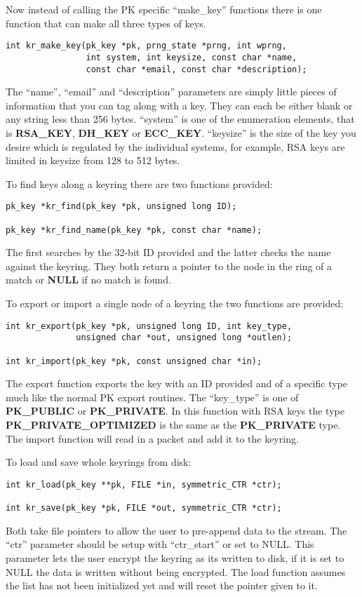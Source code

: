 \documentclass{book}
\begin{document}
Now instead of calling the PK specific ``make\_key'' functions there is one function that can make all three types of keys.
\begin{verbatim}
int kr_make_key(pk_key *pk, prng_state *prng, int wprng, 
                int system, int keysize, const char *name,
                const char *email, const char *description);
\end{verbatim}
The ``name'', ``email'' and ``description'' parameters are simply little pieces of information that you can tag along with a
key.  They can each be either blank or any string less than 256 bytes.  ``system'' is one of the enumeration elements, that
is {\bf RSA\_KEY}, {\bf DH\_KEY} or {\bf ECC\_KEY}.  ``keysize'' is the size of the key you desire which is regulated by
the individual systems, for example, RSA keys are limited in keysize from 128 to 512 bytes.

To find keys along a keyring there are two functions provided:
\begin{verbatim}
pk_key *kr_find(pk_key *pk, unsigned long ID);

pk_key *kr_find_name(pk_key *pk, const char *name);
\end{verbatim}
The first searches by the 32-bit ID provided and the latter checks the name against the keyring.  They both return a pointer
to the node in the ring of a match or {\bf NULL} if no match is found.

To export or import a single node of a keyring the two functions are provided:
\begin{verbatim}
int kr_export(pk_key *pk, unsigned long ID, int key_type, 
              unsigned char *out, unsigned long *outlen);

int kr_import(pk_key *pk, const unsigned char *in);
\end{verbatim}
The export function exports the key with an ID provided and of a specific type much like the normal PK export routines.  The
``key\_type'' is one of {\bf PK\_PUBLIC} or {\bf PK\_PRIVATE}.  In this function with RSA keys the type 
{\bf PK\_PRIVATE\_OPTIMIZED} is the same as the {\bf PK\_PRIVATE} type.  The import function will read in a packet and 
add it to the keyring.  

To load and save whole keyrings from disk:
\begin{verbatim}
int kr_load(pk_key **pk, FILE *in, symmetric_CTR *ctr);

int kr_save(pk_key *pk, FILE *out, symmetric_CTR *ctr);
\end{verbatim}
Both take file pointers to allow the user to pre-append data to the stream.  The ``ctr'' parameter should be setup with 
``ctr\_start'' or set to NULL.  This parameter lets the user encrypt the keyring as its written to disk, if it is set
to NULL the data is written without being encrypted.  The load function assumes the list has not been initialized yet 
and will reset the pointer given to it.
\end{document}
